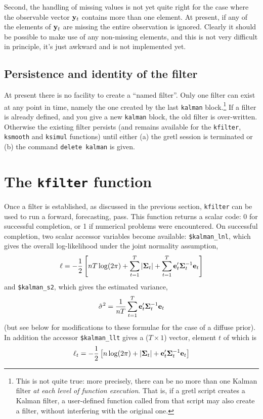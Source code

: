\documentclass[a4paper]{article}
\newcommand{\obsvec}{\ensuremath\mathbf{y}}
\newcommand{\prederr}{\ensuremath\mathbf{e}}
\newcommand{\predvar}{\ensuremath{\bm\Sigma}}
\begin{document}
Second, the handling of missing values is not yet quite right for the
case where the observable vector $\obsvec_t$ contains more than one
element.  At present, if any of the elements of $\obsvec_t$ are
missing the entire observation is ignored.  Clearly it should be
possible to make use of any non-missing elements, and this is not
very difficult in principle, it's just awkward and is not
implemented yet.

\subsection{Persistence and identity of the filter}

At present there is no facility to create a ``named filter''.  Only
one filter can exist at any point in time, namely the one created by
the last \texttt{kalman} block.\footnote{This is not quite true: more
  precisely, there can be no more than one Kalman filter \textit{at
    each level of function execution}.  That is, if a gretl script
  creates a Kalman filter, a user-defined function called from that
  script may also create a filter, without interfering with the
  original one.}  If a filter is already defined, and you give a new
\texttt{kalman} block, the old filter is over-written.  Otherwise the
existing filter persists (and remains available for the
\texttt{kfilter}, \texttt{ksmooth} and \texttt{ksimul} functions)
until either (a) the gretl session is terminated or (b) the command
\texttt{delete kalman} is given.


\section{The \texttt{kfilter} function}

Once a filter is established, as discussed in the previous section,
\texttt{kfilter} can be used to run a forward, forecasting, pass.
This function returns a scalar code: 0 for successful completion, or 1
if numerical problems were encountered.  On successful completion, two
scalar accessor variables become available: \verb+$kalman_lnl+, which
gives the overall log-likelihood under the joint normality assumption,
%
\[
  \ell = -\frac{1}{2} \left[nT \log(2 \pi) + \sum_{t=1}^T\left|\predvar_t\right| + 
    \sum_{t=1}^T\prederr_t'\predvar_t^{-1} \prederr_t
  \right]
\]
%
and \verb+$kalman_s2+, which gives the estimated variance,
%
\[
\hat{\sigma}^2 = \frac{1}{nT} 
   \sum_{t=1}^T\prederr_t'\predvar_t^{-1} \prederr_t
\]
(but see below for modifications to these formulae for the case of a
diffuse prior).  In addition the accessor \verb+$kalman_llt+ gives a
($T \times 1$) vector, element $t$ of which is
%
\[
  \ell_t = -\frac{1}{2} \left[n \log(2 \pi) + \left|\predvar_t\right| + 
    \prederr_t'\predvar_t^{-1} \prederr_t
  \right]
\]
%
\end{document}
